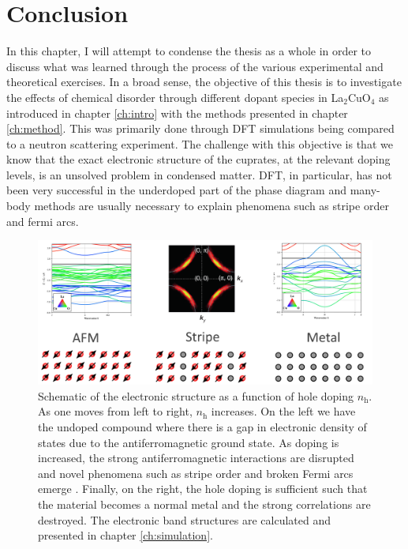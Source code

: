 \chapter{Conclusion}\label{ch:conclusion}
In this chapter, I will attempt to condense the thesis as a whole in order to discuss what was learned through the process of the various experimental and theoretical exercises. In a broad sense, the objective of this thesis is to investigate the effects of chemical disorder through different dopant species in La$_2$CuO$_4$ as introduced in chapter \ref{ch:intro} with the methods presented in chapter \ref{ch:method}. This was primarily done through DFT simulations being compared to a neutron scattering experiment. The challenge with this objective is that we know that the exact electronic structure of the cuprates, at the relevant doping levels, is an unsolved problem in condensed matter. DFT, in particular, has not been very successful in the underdoped part of the phase diagram and many-body methods are usually necessary to explain phenomena such as stripe order and fermi arcs.

\begin{figure}
    \centering
    \includegraphics[width=\textwidth]{fig/conclusion/stripe_electronic_structure.png}
    \caption{Schematic of the electronic structure as a function of hole doping $n_\text{h}$. As one moves from left to right, $n_\text{h}$ increases. On the left we have the undoped compound where there is a gap in electronic density of states due to the antiferromagnetic ground state. As doping is increased, the strong antiferromagnetic interactions are disrupted and novel phenomena such as stripe order and broken Fermi arcs emerge \cite{Keimer2015}. Finally, on the right, the hole doping is sufficient such that the material becomes a normal metal and the strong correlations are destroyed. The electronic band structures are calculated and presented in chapter \ref{ch:simulation}.}
    \label{fig:conclusion_stripe_dft}
\end{figure}

